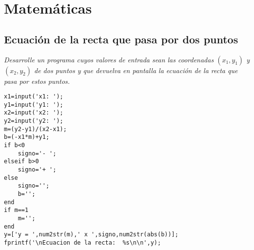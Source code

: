 \chapter{Matemáticas}

\section{Ecuación de la recta que pasa por dos puntos}

\textit{Desarrolle un programa cuyos valores de entrada sean las coordenadas $(x_1,y_1)$  y $(x_2,y_2)$  
de dos puntos y que devuelva en pantalla la ecuación de la recta que pasa por estos puntos.}

\begin{verbatim}
x1=input('x1: ');
y1=input('y1: ');
x2=input('x2: ');
y2=input('y2: ');
m=(y2-y1)/(x2-x1);
b=(-x1*m)+y1;
if b<0
    signo='- ';
elseif b>0 
    signo='+ ';
else
    signo='';
    b='';
end 
if m==1
    m='';
end
y=['y = ',num2str(m),' x ',signo,num2str(abs(b))];
fprintf('\nEcuacion de la recta:  %s\n\n',y);
\end{verbatim}
